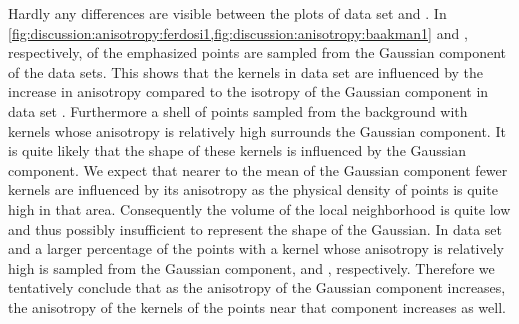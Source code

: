 				Hardly any differences are visible between the plots of data set \ferdosiOne and \baakmanOne.
					In \cref{fig:discussion:anisotropy:ferdosi1,fig:discussion:anisotropy:baakman1}  and , respectively, of the emphasized points are sampled from the Gaussian component of the data sets. This shows that the kernels in data set \baakmanOne are influenced by the increase in anisotropy compared to the isotropy of the Gaussian component in data set \ferdosiOne.
					Furthermore a shell of points sampled from the background with kernels whose anisotropy is relatively high surrounds the Gaussian component. It is quite likely that the shape of these kernels is influenced by the Gaussian component.
					We expect that nearer to the mean of the Gaussian component fewer kernels are influenced by its anisotropy as the physical density of points is quite high in that area. Consequently the volume of the local neighborhood is quite low and thus possibly insufficient to represent the shape of the Gaussian.
				In data set \baakmanFour and \baakmanFive a larger percentage of the points with a kernel whose anisotropy is relatively high is sampled from the Gaussian component,  and , respectively.
				Therefore we tentatively conclude that as the anisotropy of the Gaussian component increases, the anisotropy of the kernels of the points near that component increases as well.

